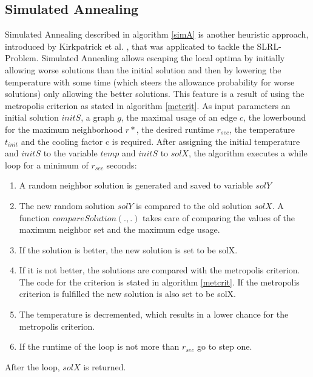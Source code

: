 \documentclass [12pt]{article}
\begin{document}
\subsection{Simulated Annealing}
Simulated Annealing described in algorithm \ref{simA} is another heuristic approach, introduced by Kirkpatrick et al. \cite{Kirkpatrick83optimizationby}, that
was applicated to tackle the SLRL-Problem. Simulated Annealing allows 
escaping the local optima by initially allowing worse solutions than the initial solution and then by lowering the temperature with some time (which steers the allowance probability for worse solutions)
only allowing the better solutions.
This feature is a result of using the metropolis criterion as stated in algorithm \ref{metcrit}.
As input parameters an initial solution $initS$, a graph $g$, the maximal usage of an edge $c$, the lowerbound for the maximum neighborhood $r*$,
the desired runtime $r_{sec}$, the temperature $t_{init}$ and the cooling factor c is required.
After assigning the initial temperature and $initS$ to the variable $temp$ and $initS$ to $solX$,
the algorithm executes a while loop for a minimum of $r_{sec}$ seconds:
\begin{enumerate}
  \item {A random neighbor solution is generated and saved to variable $solY$}
  \item {The new random solution $solY$ is compared to the old solution $solX$. A function $compareSolution(.,.)$ takes care of 
    comparing the values of the maximum neighbor set and the maximum edge usage.}
  \item {If the solution is better, the new solution is set to be solX.}
  \item {If it is not better, the solutions are compared with the metropolis criterion. The code for the criterion is stated in algorithm \ref{metcrit}. If the metropolis criterion
    is fulfilled the new solution is also set to be solX. }
  \item {The temperature is decremented, which results in a lower chance for the metropolis criterion.}
  \item {If the runtime of the loop is not more than $r_{sec}$ go to step one.}
\end{enumerate}
After the loop, $solX$ is returned.
\end{document}
